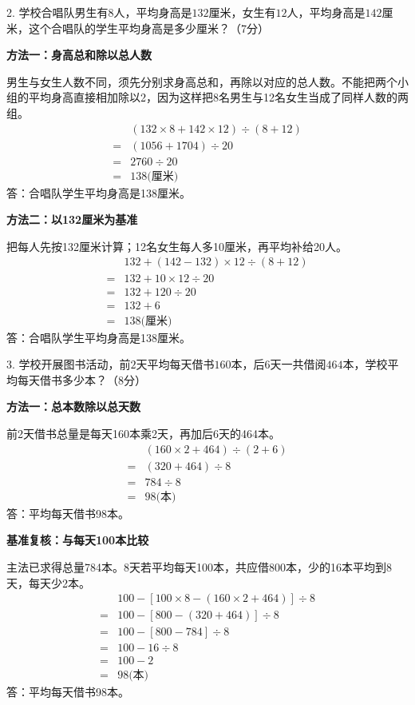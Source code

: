 2. 学校合唱队男生有\(8\)人，平均身高是\(132\)厘米，女生有\(12\)人，平均身高是\(142\)厘米，这个合唱队的学生平均身高是多少厘米？（7分）\par
\begin{BookAnswer}
\textbf{方法一：身高总和除以总人数}\par 男生与女生人数不同，须先分别求身高总和，再除以对应的总人数。不能把两个小组的平均身高直接相加除以2，因为这样把8名男生与12名女生当成了同样人数的两组。\[\begin{aligned} &(132\times8+142\times12)\div(8+12)\\ ={}&(1056+1704)\div20\\ ={}&2760\div20\\ ={}&138\text{(厘米)}\end{aligned}\]答：合唱队学生平均身高是138厘米。\par \textbf{方法二：以132厘米为基准}\par 把每人先按132厘米计算；12名女生每人多10厘米，再平均补给20人。\[\begin{aligned} &132+(142-132)\times12\div(8+12)\\ ={}&132+10\times12\div20\\ ={}&132+120\div20\\ ={}&132+6\\ ={}&138\text{(厘米)}\end{aligned}\]答：合唱队学生平均身高是138厘米。\par
\end{BookAnswer}

3. 学校开展图书活动，前\(2\)天平均每天借书\(160\)本，后\(6\)天一共借阅\(464\)本，学校平均每天借书多少本？（8分）\par
\begin{BookAnswer}
\textbf{方法一：总本数除以总天数}\par 前2天借书总量是每天160本乘2天，再加后6天的464本。\[\begin{aligned} &(160\times2+464)\div(2+6)\\ ={}&(320+464)\div8\\ ={}&784\div8\\ ={}&98\text{(本)}\end{aligned}\]答：平均每天借书98本。\par \textbf{基准复核：与每天100本比较}\par 主法已求得总量784本。8天若平均每天100本，共应借800本，少的16本平均到8天，每天少2本。\[\begin{aligned} &100-[100\times8-(160\times2+464)]\div8\\ ={}&100-[800-(320+464)]\div8\\ ={}&100-[800-784]\div8\\ ={}&100-16\div8\\ ={}&100-2\\ ={}&98\text{(本)}\end{aligned}\]答：平均每天借书98本。\par
\end{BookAnswer}


